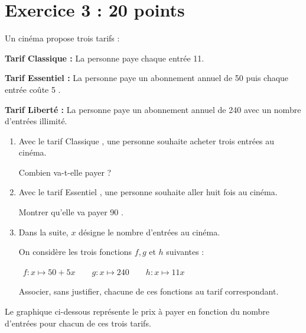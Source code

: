 \documentclass[11pt]{article}
\newcommand{\euro}{\eurologo{}}
\begin{document}
\section*{Exercice 3 : \hfill 20 points}

Un cinéma propose trois tarifs :

\textbf{Tarif \og{} Classique \fg{} :} La personne paye chaque entrée 11\euro{}.

\textbf{Tarif \og{} Essentiel \fg{} :} La personne paye un abonnement annuel de 50 \euro{} puis chaque entrée coûte 5 \euro{}.

\textbf{Tarif \og{} Liberté \fg{} :} La personne paye un abonnement annuel de 240 \euro{} avec un nombre d'entrées illimité.

\begin{enumerate}
	\item Avec le tarif \og{} Classique \fg{}, une personne souhaite acheter trois entrées au cinéma.

	Combien va-t-elle payer ?

	\item Avec le tarif \og{} Essentiel \fg{}, une personne souhaite aller huit fois au cinéma.

	Montrer qu'elle va payer 90 \euro{}.

	\item Dans la suite, $x$ désigne le nombre d'entrées au cinéma.

On considère les trois fonctions $f, g$ et $h$ suivantes :

	\hfill~$f: x \longmapsto 50+5 x \qquad g: x \longmapsto 240 \qquad h: x \longmapsto 11 x$\hfill~

Associer, sans justifier, chacune de ces fonctions au tarif correspondant.
\end{enumerate}

Le graphique ci-dessous représente le prix à payer en fonction du nombre d'entrées pour chacun de ces trois tarifs.

\begin{center}
\end{center}
\end{document}
